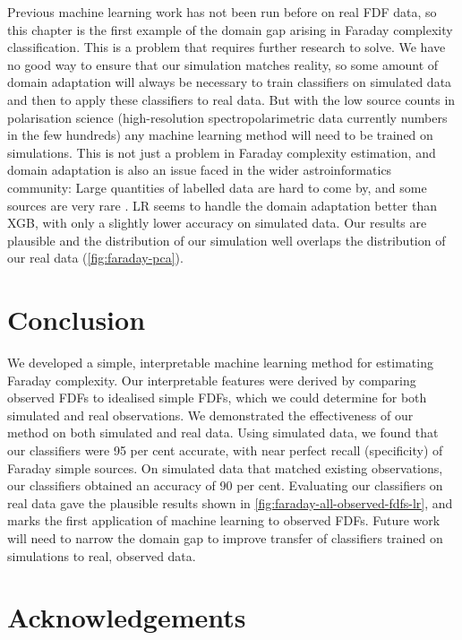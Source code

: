     Previous machine learning work \citep[e.g.][]{brown_classifying_2018} has not been run before on real FDF data, so this chapter is the first example of the domain gap arising in Faraday complexity classification. This is a problem that requires further research to solve. We have no good way to ensure that our simulation matches reality, so some amount of domain adaptation will always be necessary to train classifiers on simulated data and then to apply these classifiers to real data. But with the low source counts in polarisation science (high-resolution spectropolarimetric data currently numbers in the few hundreds) any machine learning method will need to be trained on simulations. This is not just a problem in Faraday complexity estimation, and domain adaptation is also an issue faced in the wider astroinformatics community: Large quantities of labelled data are hard to come by, and some sources are very rare \citep[e.g. gravitational wave detections or fast radio bursts;][]{zevin17gravityspy, gebhard19convolutional,agarwal_fetch_2020}. LR seems to handle the domain adaptation better than XGB, with only a slightly lower accuracy on simulated data. Our results are plausible and the distribution of our simulation well overlaps the distribution of our real data (\autoref{fig:faraday-pca}).

\section{Conclusion}
\label{sec:faraday-conclusion}

  We developed a simple, interpretable machine learning method for estimating Faraday complexity. Our interpretable features were derived by comparing observed FDFs to idealised simple FDFs, which we could determine for both simulated and real observations. We demonstrated the effectiveness of our method on both simulated and real data. Using simulated data, we found that our classifiers were 95 per cent accurate, with near perfect recall (specificity) of Faraday simple sources. On simulated data that matched existing observations, our classifiers obtained an accuracy of 90 per cent. Evaluating our classifiers on real data gave the plausible results shown in \autoref{fig:faraday-all-observed-fdfs-lr}, and marks the first application of machine learning to observed FDFs. Future work will need to narrow the domain gap to improve transfer of classifiers trained on simulations to real, observed data.

\section{Acknowledgements}

